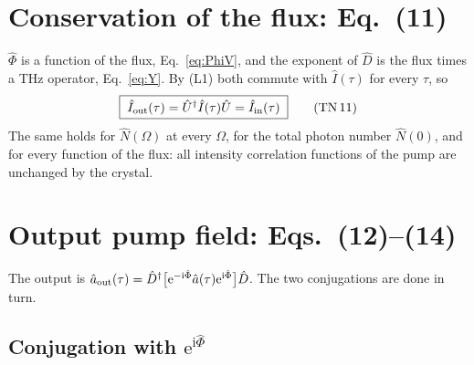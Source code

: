 \documentclass[aps,pra,onecolumn,notitlepage,11pt,amsmath,amssymb,nofootinbib]{revtex4-2}
\newcommand{\Nop}{\hat N}
\newcommand{\Iop}{\hat I}
\newcommand{\ee}{\mathrm{e}}
\newcommand{\ii}{\mathrm{i}}
\newcommand{\TN}[1]{\text{TN\,#1}}
\begin{document}
\section{Conservation of the flux: Eq.~(11)}
\label{sec:flux}

$\hat\Phi$ is a function of the flux, Eq.~\eqref{eq:PhiV}, and the exponent of
$\hat D$ is the flux times a THz operator, Eq.~\eqref{eq:Y}. By (L1) both
commute with $\Iop(\tau)$ for every $\tau$, so
\begin{equation}
\boxed{\;\Iop_{\rm out}(\tau)=\hat U^\dagger\Iop(\tau)\hat U=\Iop_{\rm in}(\tau)\;}
\tag{\TN{11}}
\end{equation}
The same holds for $\Nop(\Omega)$ at every $\Omega$, for the total photon
number $\Nop(0)$, and for every function of the flux: all intensity
correlation functions of the pump are unchanged by the crystal.

\section{Output pump field: Eqs.~(12)--(14)}
\label{sec:a}

The output is
$\hat a_{\rm out}(\tau)=\hat D^\dagger\big[\ee^{-\ii\hat\Phi}\hat a(\tau)\ee^{\ii\hat\Phi}\big]\hat D$.
The two conjugations are done in turn.

\subsection{Conjugation with \texorpdfstring{$\ee^{\ii\hat\Phi}$}{exp(i Phi)}}
\end{document}
